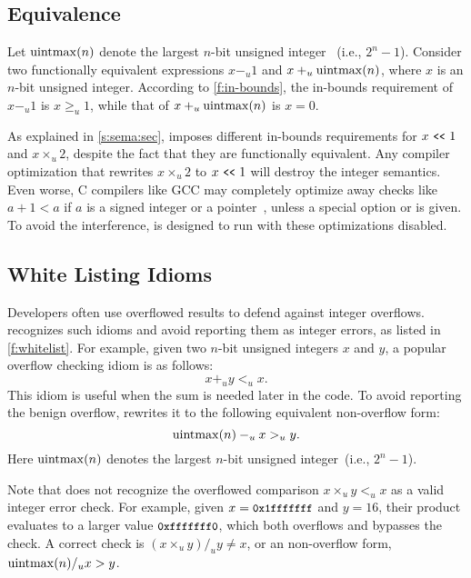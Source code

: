 \subsection{Equivalence}
\label{s:sema:eqv}

Let $\operatorname{uintmax}(n)$ denote the largest $n$-bit unsigned integer ~(i.e.,
$2^n-1$).  Consider two functionally equivalent expressions $x -_u
1$ and $x +_u \operatorname{uintmax}(n)$, where $x$ is an $n$-bit unsigned integer.
According to \autoref{f:in-bounds}, the in-bounds requirement of
$x -_u 1$ is $x \geq_u 1$, while that of $x +_u \operatorname{uintmax}(n)$ is $x
= 0$.

As explained in \autoref{s:sema:sec}, \sys imposes different in-bounds
requirements for $x \shl 1$ and $x \times_u 2$, despite the fact
that they are functionally equivalent.
Any compiler optimization that rewrites $x \times_u 2$ to $x \shl
1$ will destroy the integer semantics.
%
%
Even worse, C compilers like GCC may completely
optimize away checks like $a + 1 < a$ if $a$ is a signed integer
or a pointer~\cite{gcc:signed-overflow,us-cert:gcc}, unless a special
option  or  is
given.  To avoid the interference, \sys is designed to run with
these optimizations disabled.
\fi

\subsection{White Listing Idioms}
\label{s:sema:whitelist}

Developers often use overflowed results to defend against integer
overflows.  \sys recognizes such idioms and avoid reporting them
as integer errors, as listed in \autoref{f:whitelist}.  For example,
given two $n$-bit unsigned integers $x$ and $y$, a popular overflow
checking idiom is as follows:
\begin{equation*}
x +_u y <_u x.
\end{equation*}
This idiom is useful when the sum is needed later in the code.
To avoid reporting the benign overflow,
\sys rewrites it to the following equivalent non-overflow form:
\begin{equation*}
\operatorname{uintmax}(n) -_u x >_u y.
\end{equation*}
Here $\operatorname{uintmax}(n)$ denotes the largest $n$-bit unsigned integer~(i.e.,
$2^n - 1$).

Note that \sys does not recognize the overflowed comparison $x
\times_u y <_u x$ as a valid integer error check.  For example,
given $x = \cc{0x1fffffff}$ and $y = 16$, their product evaluates
to a larger value $\cc{0xfffffff0}$, which both overflows and
bypasses the check.  A correct check is $(x \times_u y) /_u y \neq
x$, or an non-overflow form, $\operatorname{uintmax}(n) /_u x > y$.


